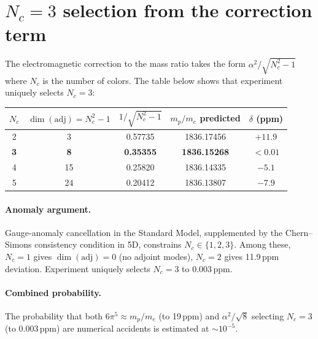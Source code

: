 \documentclass[11pt,a4paper]{article}
\begin{document}
\section{$N_c=3$ selection from the correction term}
\label{sec:Nc}

The electromagnetic correction to the mass ratio takes the form
$\alpha^2/\sqrt{N_c^2-1}$ where $N_c$ is the number of colors.
The table below shows that experiment uniquely selects $N_c=3$:
\begin{center}
\renewcommand{\arraystretch}{1.15}
\begin{tabular}{ccccc}
\toprule
$N_c$ & $\dim(\mathrm{adj})=N_c^2-1$ & $1/\sqrt{N_c^2-1}$
      & $m_p/m_e$ predicted & $\delta$ (ppm)\\
\midrule
2 & 3 & 0.57735 & 1836.17456 & $+11.9$\\
\textbf{3} & \textbf{8} & \textbf{0.35355} & \textbf{1836.15268} & $\mathbf{<0.01}$\\
4 & 15 & 0.25820 & 1836.14335 & $-5.1$\\
5 & 24 & 0.20412 & 1836.13807 & $-7.9$\\
\bottomrule
\end{tabular}
\end{center}

\paragraph{Anomaly argument.}
Gauge-anomaly cancellation in the Standard Model, supplemented by the
Chern--Simons consistency condition in 5D, constrains $N_c\in\{1,2,3\}$.
Among these, $N_c=1$ gives $\dim(\mathrm{adj})=0$ (no adjoint modes),
$N_c=2$ gives 11.9\,ppm deviation.  Experiment uniquely selects $N_c=3$
to 0.003\,ppm.

\paragraph{Combined probability.}
The probability that both $6\pi^5\approx m_p/m_e$ (to 19\,ppm) and
$\alpha^2/\sqrt{8}$ selecting $N_c=3$ (to 0.003\,ppm) are numerical
accidents is estimated at $\sim10^{-5}$.

\end{document}
